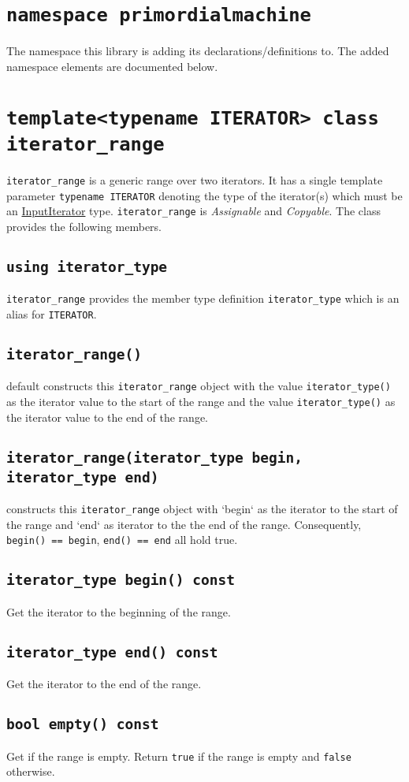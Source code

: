 \documentclass[oneside]{book}
\begin{document}
\section{\texttt{namespace primordialmachine}}
The namespace this library is adding its declarations/definitions to.
The added namespace elements are documented below.

\section{\texttt{template<typename ITERATOR> class iterator\_range}}
\texttt{iterator\_range} is a generic range over two iterators.
It has a single template parameter \texttt{typename ITERATOR} denoting the type of the     iterator(s)
which must be an \href{https://en.cppreference.com/w/cpp/named_req/InputIterator}{InputIterator} type.
\texttt{iterator\_range} is \textit{Assignable} and \textit{Copyable}. The class provides         the
following members.

\subsection{\texttt{using iterator\_type}}
\texttt{iterator\_range} provides the member type definition \texttt{iterator\_type} which is an alias
for \texttt{ITERATOR}.

\subsection{\texttt{iterator\_range()}}
default
constructs this \texttt{iterator\_range} object with
the value \texttt{iterator\_type()} as the iterator value to the start of the range and
the value \texttt{iterator\_type()} as the iterator value to the end of the range.

\subsection{\texttt{iterator\_range(iterator\_type begin, iterator\_type end)}}
constructs this \texttt{iterator\_range} object with
`begin` as the iterator to the start of the range and
`end` as iterator to the the end of the range.
Consequently, \texttt{begin() == begin}, \texttt{end() == end} all hold true.

\subsection{\texttt{iterator\_type begin() const}}
Get the iterator to the beginning of the range.

\subsection{\texttt{iterator\_type end() const}}
Get the iterator to the end of the range.

\subsection{\texttt{bool empty() const}}
Get if the range is empty.
Return \verb+true+ if the range is empty and \verb+false+ otherwise.
\end{document}
